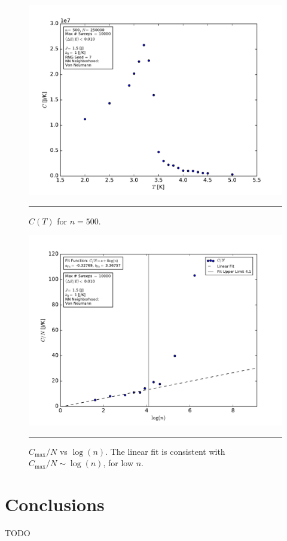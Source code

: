 \documentclass[notitlepage,aps,prd,nofootinbib]{revtex4-1}
\begin{document}
\begin{figure}[!htbc]
  \centering
  \includegraphics[width=.75\textwidth]{../output/plots_for_paper_von_neumann/part_b/CT_for_n500.pdf}
	{\par\nobreak\rule[9pt]{35em}{0.5pt}\vspace{-5mm}}
	\caption{$C\left(T\right)$ for $n=500$.}
	\label{fig:CT_n500}
\end{figure}


\clearpage
\begin{figure}[!htbc]
  \centering
  \includegraphics[width=.82\textwidth]{../output/plots_for_paper_von_neumann/part_b/Cmax_over_N_vs_n.pdf}
	{\par\nobreak\rule[9pt]{35em}{0.5pt}\vspace{-5mm}}
	\caption{$C_{\mathrm{max}}/N$ vs $\log(n)$. The linear fit is consistent with $C_{\mathrm{max}}/N \sim \log(n)$, for low $n$.}
	\label{fig:Cmax_over_N_vs_n}
\end{figure}


\section{Conclusions}
\label{sec:Conclusions}
TODO
\end{document}
